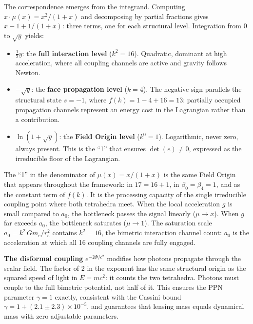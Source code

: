 \documentclass[aps,prd,preprint,superscriptaddress,showpacs,preprintnumbers,amsmath,amssymb,nofootinbib]{revtex4-2}
\begin{document}
The correspondence emerges from the integrand. Computing $x \cdot \mu(x) = x^2/(1+x)$ and decomposing by partial fractions gives $x - 1 + 1/(1+x)$: three terms, one for each structural level. Integration from $0$ to $\sqrt{y}$ yields:
\begin{itemize}
\item $\tfrac{1}{2}y$: the \textbf{full interaction level} ($k^2 = 16$). Quadratic, dominant at high acceleration, where all coupling channels are active and gravity follows Newton.
\item $-\sqrt{y}$: the \textbf{face propagation level} ($k = 4$). The negative sign parallels the structural state $s = -1$, where $f(k) = 1 - 4 + 16 = 13$: partially occupied propagation channels represent an energy cost in the Lagrangian rather than a contribution.
\item $\ln(1 + \sqrt{y})$: the \textbf{Field Origin level} ($k^0 = 1$). Logarithmic, never zero, always present. This is the ``1'' that ensures $\det(e) \neq 0$, expressed as the irreducible floor of the Lagrangian.
\end{itemize}

The ``1'' in the denominator of $\mu(x) = x/(1+x)$ is the same Field Origin that appears throughout the framework: in $17 = 16 + 1$, in $\beta_0 = \beta_4 = 1$, and as the constant term of $f(k)$. It is the processing capacity of the single irreducible coupling point where both tetrahedra meet. When the local acceleration $g$ is small compared to $a_0$, the bottleneck passes the signal linearly ($\mu \to x$). When $g$ far exceeds $a_0$, the bottleneck saturates ($\mu \to 1$). The saturation scale $a_0 = k^2\,Gm_e/r_e^2$ contains $k^2 = 16$, the bimetric interaction channel count: $a_0$ is the acceleration at which all 16 coupling channels are fully engaged.

\textbf{The disformal coupling} $e^{-2\Phi/c^2}$ modifies how photons propagate through the scalar field. The factor of 2 in the exponent has the same structural origin as the squared speed of light in $E = mc^2$: it counts the two tetrahedra. Photons must couple to the full bimetric potential, not half of it. This ensures the PPN parameter $\gamma = 1$ exactly, consistent with the Cassini bound $\gamma = 1 + (2.1 \pm 2.3) \times 10^{-5}$, and guarantees that lensing mass equals dynamical mass with zero adjustable parameters.
\end{document}
